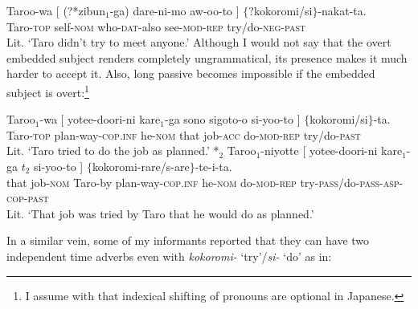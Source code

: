 \documentclass[output=paper]{langsci/langscibook}
\begin{document}
\ea\label{shimamu32} \gll Taroo-wa [ (?*zibun$_1$-ga) dare-ni-mo aw-oo-to ] $\{$?kokoromi/si$\}$-nakat-ta.\\
Taro-\textsc{top} {} \phantom{?*}self-\textsc{nom} who-\textsc{dat}-also see-\textsc{mod-rep} {} try/do-\textsc{neg-past}\\
\glt Lit. `Taro didn't try to meet anyone.'
\z
Although I would not say that the overt embedded subject renders  completely ungrammatical, its presence makes it much harder to accept it. Also, long passive becomes impossible if the embedded subject is overt:\footnote{I assume with \citet{sudo2012} that indexical shifting of pronouns are optional in Japanese.}

\ea\label{shimamu33} 
\begin{xlist} 
\ex \gll Taroo$_1$-wa [  yotee-doori-ni kare$_1$-ga sono sigoto-o si-yoo-to ] $\{$kokoromi/si$\}$-ta.\\
Taro-\textsc{top} {} plan-way-\textsc{cop.inf} he-\textsc{nom} that job-\textsc{acc} do-\textsc{mod-rep} {} \phantom{$\{$}try/do-\textsc{past}\\
\glt Lit. `Taro tried to do the job as planned.'
\ex \hspace{-1.5mm}*{$_2$ Taroo$_1$-niyotte [  yotee-doori-ni kare$_1$-ga $t_2$ si-yoo-to ] $\{$kokoromi-rare/s-are$\}$-te-i-ta.\\
 \phantom{[}that job-\textsc{nom} Taro-by {} plan-way-\textsc{cop.inf} he-\textsc{nom} {} do-\textsc{mod-rep} {} \phantom{$\{$}try-\textsc{pass}/do-\textsc{pass}-\textsc{asp-cop-past}\\
\glt Lit. `That job was tried by Taro that he would do as planned.'}
\end{xlist}
\z
In a similar vein, some of my informants reported that they can have two independent time adverbs even with \textit{kokoromi-} `try'/\textit{si-} `do' as in:
\end{document}
